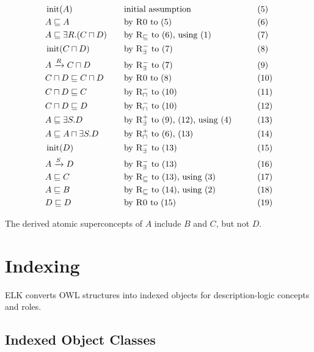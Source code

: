 \documentclass[11pt]{article}
\newcommand{\sub}{\sqsubseteq}
\newcommand{\init}{\operatorname{init}}
\begin{document}
\begin{alignat}{3}
&\init(A) &&\quad \text{initial assumption} &&\tag{5}\\
&A \sub A &&\quad \text{by } \textsc{R0} \text{ to (5)} &&\tag{6}\\
&A \sub \exists R.(C \sqcap D) &&\quad \text{by } \textsc{R}_{\sub} \text{ to (6), using (1)} &&\tag{7}\\
&\init(C \sqcap D) &&\quad \text{by } \textsc{R}_{\exists}^{-} \text{ to (7)} &&\tag{8}\\
&A \xrightarrow{R} C \sqcap D &&\quad \text{by } \textsc{R}_{\exists}^{-} \text{ to (7)} &&\tag{9}\\
&C \sqcap D \sub C \sqcap D &&\quad \text{by } \textsc{R0} \text{ to (8)} &&\tag{10}\\
&C \sqcap D \sub C &&\quad \text{by } \textsc{R}_{\sqcap}^{-} \text{ to (10)} &&\tag{11}\\
&C \sqcap D \sub D &&\quad \text{by } \textsc{R}_{\sqcap}^{-} \text{ to (10)} &&\tag{12}\\
&A \sub \exists S.D &&\quad \text{by } \textsc{R}_{\exists}^{+} \text{ to (9), (12), using (4)} &&\tag{13}\\
&A \sub A \sqcap \exists S.D &&\quad \text{by } \textsc{R}_{\sqcap}^{+} \text{ to (6), (13)} &&\tag{14}\\
&\init(D) &&\quad \text{by } \textsc{R}_{\exists}^{-} \text{ to (13)} &&\tag{15}\\
&A \xrightarrow{S} D &&\quad \text{by } \textsc{R}_{\exists}^{-} \text{ to (13)} &&\tag{16}\\
&A \sub C &&\quad \text{by } \textsc{R}_{\sub} \text{ to (13), using (3)} &&\tag{17}\\
&A \sub B &&\quad \text{by } \textsc{R}_{\sub} \text{ to (14), using (2)} &&\tag{18}\\
&D \sub D &&\quad \text{by } \textsc{R0} \text{ to (15)} &&\tag{19}
\end{alignat}

The derived atomic superconcepts of $A$ include $B$ and $C$, but not $D$.

\section{Indexing}

ELK converts OWL structures into indexed objects for description-logic concepts and roles.

\subsection{Indexed Object Classes}
\end{document}
